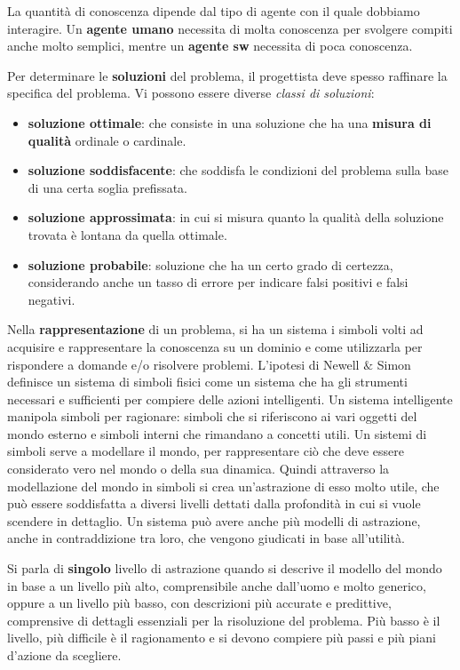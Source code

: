 \documentclass[a4paper]{extarticle}
\begin{document}
La quantità di conoscenza dipende dal tipo di agente con il quale dobbiamo interagire. Un \textbf{agente umano} necessita di molta conoscenza per svolgere compiti anche molto semplici, mentre un \textbf{agente sw} necessita di poca conoscenza.

Per determinare le \textbf{soluzioni} del problema, il progettista deve spesso raffinare la specifica del problema. Vi possono essere diverse \textit{classi di soluzioni}:
\begin{itemize}
\item \textbf{soluzione ottimale}: che consiste in una soluzione che ha una \textbf{misura di qualità} ordinale o cardinale.
\item \textbf{soluzione soddisfacente}: che soddisfa le condizioni del problema sulla base di una certa soglia prefissata.
\item \textbf{soluzione approssimata}: in cui si misura quanto la qualità della soluzione trovata è lontana da quella ottimale.
\item \textbf{soluzione probabile}: soluzione che ha un certo grado di certezza, considerando anche un tasso di errore per indicare falsi positivi e falsi negativi.
\end{itemize}

Nella \textbf{rappresentazione} di un problema, si ha un sistema i simboli volti ad acquisire e rappresentare la conoscenza su un dominio e come utilizzarla per rispondere a domande e/o risolvere problemi.  L'ipotesi di Newell $\&$ Simon definisce un sistema di simboli fisici come un sistema che ha gli strumenti necessari e sufficienti per compiere delle azioni intelligenti. Un sistema intelligente manipola simboli per ragionare: simboli che si riferiscono ai vari oggetti del mondo esterno e simboli interni che rimandano a concetti utili. Un sistemi di simboli serve a modellare il mondo, per rappresentare ciò che deve essere considerato vero nel mondo o della sua dinamica. Quindi attraverso la modellazione del mondo in simboli si crea un'astrazione di esso molto utile, che può essere soddisfatta a diversi livelli dettati dalla profondità in cui si vuole scendere in dettaglio. Un sistema può avere anche più modelli di astrazione, anche in contraddizione tra loro, che vengono giudicati in base all'utilità.

Si parla di \textbf{singolo} livello di astrazione quando si descrive il modello del mondo in base a un livello più alto, comprensibile anche dall'uomo e molto generico, oppure a un livello più basso, con descrizioni più accurate e predittive, comprensive di dettagli essenziali per la risoluzione del problema. Più basso è il livello, più difficile è il ragionamento e si devono compiere più passi e più piani d'azione da scegliere.
\end{document}
